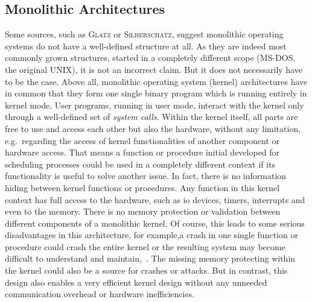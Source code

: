 \subsection{Monolithic Architectures}\label{sec:monolithic-archs}
Some sources, such as \textsc{Glatz}\cite{glatz2015betriebssysteme} or \textsc{Silberschatz}\cite{silberschatz2009operating}, suggest monolithic operating systems do not have a well-defined structure at all. 
As they are indeed most commonly grown structures, started in a completely different scope (MS-DOS, the original UNIX), it is not an incorrect claim.
But it does not necessarily have to be the case.
Above all, monolithic operating system (kernel) architectures have in common that they form one single binary program which is running entirely in kernel mode.
User programs, running in user mode, interact with the kernel only through a well-defined set of \textit{system calls}\cite{lfd430}. 
Within the kernel itself, all parts are free to use and access each other but also the hardware, without any limitation, e.g.\ regarding the access of kernel functionalities of another component or hardware access. 
That means a function or procedure initial developed for scheduling processes could be used in a completely different context if its functionality is useful to solve another issue.
In fact, there is no information hiding between kernel functions or procedures.
Any function in this kernel context has full access to the hardware, such as \ac{io} devices, timers, interrupts and even to the memory. 
There is no memory protection or validation between different components of a monolithic kernel. 
Of course, this leads to some serious disadvantages in this architecture, for example,a crash in one single function or procedure could crash the entire kernel or the resulting system may become difficult to understand and maintain\cite{tanenbaum-modern-operating-systems},~\cite{silberschatz2009operating}.
The missing memory protecting within the kernel could also be a source for crashes or attacks.
But in contrast, this design also enables a very efficient kernel design without any unneeded communication overhead or hardware inefficiencies\cite{lfd430}.

